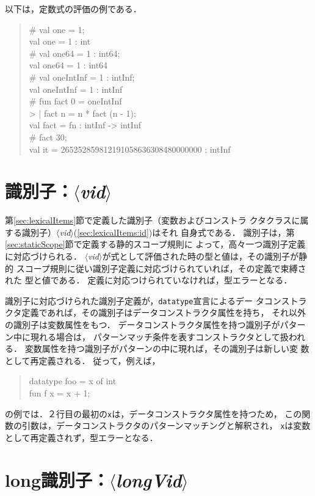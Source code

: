 \documentclass{jbook}
\newcommand{\code}[1]{\mbox{\large\tt #1}}
\newcommand{\nonterm}[1]{\mbox{$\langle$}{\it #1}\mbox{$\rangle$}}
\newenvironment{program}{\begin{quote}\begin{tt}}%
                        {\end{tt}\end{quote}}
\begin{document}
	以下は，定数式の評価の例である．
\begin{program}
\# val one = 1;\\
val one = 1 : int\\
\# val one64 = 1 : int64;\\
val one64 = 1 : int64\\
\# val oneIntInf = 1 : intInf;\\
val oneIntInf = 1 : intInf\\
\# fun fact 0 = oneIntInf\\
>   | fact n = n * fact (n - 1);\\
val fact = fn : intInf -> intInf\\
\# fact 30;\\
val it = 265252859812191058636308480000000 : intInf
\end{program}


\section{識別子：\nonterm{vid}}

	第\ref{sec:lexicalItems}節で定義した識別子（変数およびコンストラ
クタクラスに属する識別子）\nonterm{vid}(\ref{sec:lexicalItems:id})はそれ
自身式である．
	識別子は，第\ref{sec:staticScope}節で定義する静的スコープ規則に
よって，高々一つ識別子定義に対応づけられる．
	\nonterm{vid}が式として評価された時の型と値は，その識別子が静的
スコープ規則に従い識別子定義に対応づけられていれば，その定義で束縛された
型と値である．
	定義に対応つけられていなければ，型エラーとなる．

	識別子に対応づけられた識別子定義が，\code{datatype}宣言によるデー
タコンストラクタ定義であれば，その識別子はデータコンストラクタ属性を持ち，
それ以外の識別子は変数属性をもつ．
	データコンストラクタ属性を持つ識別子がパターン中に現れる場合は，
パターンマッチ条件を表すコンストラクタとして扱われる．
	変数属性を持つ識別子がパターンの中に現れば，その識別子は新しい変
数として再定義される．
	従って，例えば，
\begin{program}
datatype foo = x of int\\
fun f x = x + 1;
\end{program}
の例では．２行目の最初の\code{x}は，データコンストラクタ属性を持つため，
この関数の引数は，データコンストラクタのパターンマッチングと解釈され，
\code{x}は変数として再定義されず，型エラーとなる．


\section{long識別子：\nonterm{longVid}}
	
\end{document}
